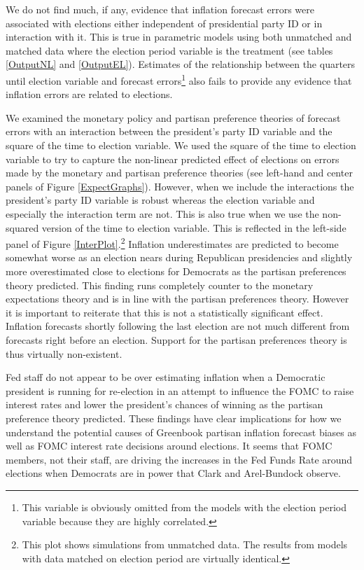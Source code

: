 \documentclass[a4paper]{article}\usepackage{graphicx, color}
\begin{document}
We do not find much, if any, evidence that inflation forecast errors were associated with elections either independent of presidential party ID or in interaction with it. This is true in parametric models using both unmatched and matched data where the election period variable is the treatment (see tables \ref{OutputNL} and \ref{OutputEL}). Estimates of the relationship between the quarters until election variable and forecast errors\footnote{This variable is obviously omitted from the models with the election period variable because they are highly correlated.} also fails to provide any evidence that inflation errors are related to elections. 

We examined the monetary policy and partisan preference theories of forecast errors with an interaction between the president's party ID variable and the square of the time to election variable. We used the square of the time to election variable to try to capture the non-linear predicted effect of elections on errors made by the monetary and partisan preference theories (see left-hand and center panels of Figure \ref{ExpectGraphs}). However, when we include the interactions the president's party ID variable is robust whereas the election variable and especially the interaction term are not. This is also true when we use the non-squared version of the time to election variable. This is reflected in the left-side panel of Figure \ref{InterPlot}.\footnote{This plot shows simulations from unmatched data. The results from models with data matched on election period are virtually identical.} Inflation underestimates are predicted to become somewhat worse as an election nears during Republican presidencies and slightly more overestimated close to elections for Democrats as the partisan preferences theory predicted. This finding runs completely counter to the monetary expectations theory and is in line with the partisan preferences theory. However it is important to reiterate that this is not a statistically significant effect. Inflation forecasts shortly following the last election are not much different from forecasts right before an election. Support for the partisan preferences theory is thus virtually non-existent.

Fed staff do not appear to be over estimating inflation when a Democratic president is running for re-election in an attempt to influence the FOMC to raise interest rates and lower the president's chances of winning as the partisan preference theory predicted. These findings have clear implications for how we understand the potential causes of Greenbook partisan inflation forecast biases as well as FOMC interest rate decisions around elections. It seems that FOMC members, not their staff, are driving the increases in the Fed Funds Rate around elections when Democrats are in power that Clark and Arel-Bundock observe.
\end{document}
